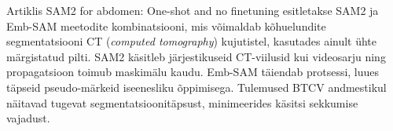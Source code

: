 Artiklis \glqq SAM2 for abdomen: One-shot and no finetuning\grqq{} esitletakse SAM2 ja Emb-SAM
 meetodite kombinatsiooni, mis võimaldab
kõhuelundite segmentatsiooni CT (\textit{computed tomography}) kujutistel, kasutades ainult ühte märgistatud
pilti. SAM2 käsitleb järjestikuseid CT-viilusid kui videosarju ning
propagatsioon toimub maskimälu kaudu. Emb-SAM täiendab protsessi, luues täpseid
pseudo-märkeid iseenesliku õppimisega. Tulemused BTCV andmestikul näitavad
tugevat segmentatsioonitäpsust, minimeerides käsitsi sekkumise vajadust. \cite{hwangSAM2AbdomenOneshot2024}

